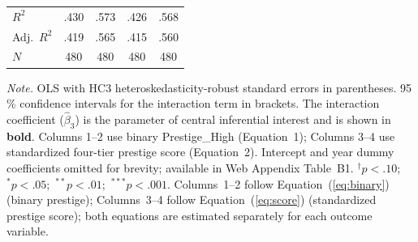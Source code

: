 \documentclass[12pt,a4paper]{article}
\begin{document}
\begin{table}[htbp]
\begin{threeparttable}
\begin{tabular}{lcccc}
$R^2$              & .430 & .573 & .426 & .568 \\
Adj.\ $R^2$        & .419 & .565 & .415 & .560 \\
$N$                & 480  & 480  & 480  & 480  \\
\bottomrule
\end{tabular}
\begin{tablenotes}
\footnotesize
\item \textit{Note.} OLS with HC3 heteroskedasticity-robust standard errors
  in parentheses. 95\,\% confidence intervals for the interaction term in
  brackets. The interaction coefficient ($\hat{\beta}_3$) is the parameter of
  central inferential interest and is shown in \textbf{bold}.
  Columns 1--2 use binary Prestige\_High (Equation~1);
  Columns 3--4 use standardized four-tier prestige score (Equation~2).
  Intercept and year dummy coefficients omitted for brevity; available in
  Web Appendix Table~B1.
  $^{\dagger}p<.10$;\ $^{*}p<.05$;\ $^{**}p<.01$;\ $^{***}p<.001$.
  Columns~1--2 follow Equation~(\ref{eq:binary}) (binary prestige);
  Columns~3--4 follow Equation~(\ref{eq:score}) (standardized
  prestige score); both equations are estimated separately for
  each outcome variable.
\end{tablenotes}
\end{threeparttable}
\end{table}

\newpage
\end{document}
